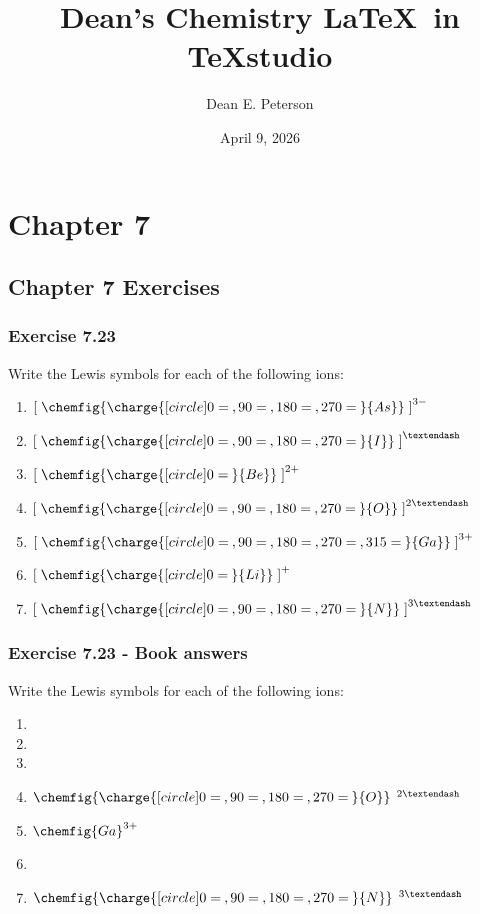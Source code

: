 \documentclass[11pt]{article}
\title{Dean's Chemistry \LaTeX\ in TeXstudio}
\author{Dean E. Peterson}
\date{April 9, 2026}
\begin{document}
\maketitle

\section{Chapter 7}
\subsection{Chapter 7 Exercises}
\subsubsection{Exercise 7.23}
Write the Lewis symbols for each of the following ions:

\begin{enumerate}
\item
    $\left[\;
    \chemfig{\charge{[circle]0=\:,90=\:,180=\:,270=\:}{As}}
    \;\right]^{3-}$
\item
    $\left[\;
    \chemfig{\charge{[circle]0=\:,90=\:,180=\:,270=\:}{I}}
    \;\right]^{–}$
\item
    $\left[\;
    \chemfig{\charge{[circle]0=\:}{Be}}
    \;\right]^{2+}$
\item
    $\left[\;
    \chemfig{\charge{[circle]0=\:,90=\:,180=\:,270=\:}{O}}
    \;\right]^{2–}$
\item
    $\left[\;
    \chemfig{\charge{[circle]0=\:,90=\:,180=\:,270=\:,315=\:}{Ga}}
    \;\right]^{3+}$
\item
    $\left[\;
    \chemfig{\charge{[circle]0=\:}{Li}}
    \;\right]^{+}$
\item
    $\left[\;
    \chemfig{\charge{[circle]0=\:,90=\:,180=\:,270=\:}{N}}
    \;\right]^{3–}$
\end{enumerate}

\subsubsection{Exercise 7.23 - Book answers}
Write the Lewis symbols for each of the following ions:

\begin{enumerate}
    \item
    \item
    \item
    \item
        $\chemfig{\charge{[circle]0=\:,90=\:,180=\:,270=\:}{O}}\;\,^{2–}$
    \item
        $\chemfig{Ga}^{3+}$
    \item
    \item
        $\chemfig{\charge{[circle]0=\:,90=\:,180=\:,270=\:}{N}}\;\,^{3–}$
\end{enumerate}
\end{document}
